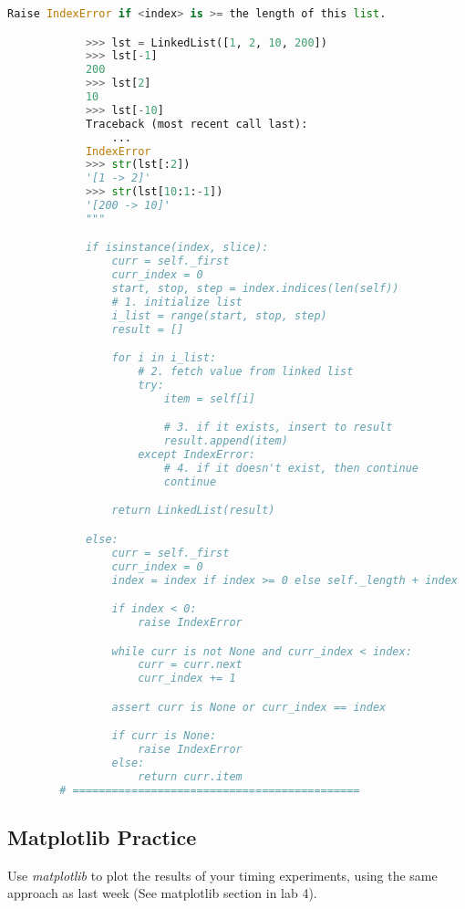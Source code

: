 \documentclass[12pt]{article}
\begin{document}
\begin{mdframed}
\begin{lstlisting}[language=python]
            Raise IndexError if <index> is >= the length of this list.

            >>> lst = LinkedList([1, 2, 10, 200])
            >>> lst[-1]
            200
            >>> lst[2]
            10
            >>> lst[-10]
            Traceback (most recent call last):
                ...
            IndexError
            >>> str(lst[:2])
            '[1 -> 2]'
            >>> str(lst[10:1:-1])
            '[200 -> 10]'
            """

            if isinstance(index, slice):
                curr = self._first
                curr_index = 0
                start, stop, step = index.indices(len(self))
                # 1. initialize list
                i_list = range(start, stop, step)
                result = []

                for i in i_list:
                    # 2. fetch value from linked list
                    try:
                        item = self[i]

                        # 3. if it exists, insert to result
                        result.append(item)
                    except IndexError:
                        # 4. if it doesn't exist, then continue
                        continue

                return LinkedList(result)

            else:
                curr = self._first
                curr_index = 0
                index = index if index >= 0 else self._length + index

                if index < 0:
                    raise IndexError

                while curr is not None and curr_index < index:
                    curr = curr.next
                    curr_index += 1

                assert curr is None or curr_index == index

                if curr is None:
                    raise IndexError
                else:
                    return curr.item
        # ============================================
\end{lstlisting}
\end{mdframed}


\subsection*{Matplotlib Practice}
Use \textit{matplotlib} to plot the results of your timing experiments, using the same
approach as last week (See matplotlib section in lab 4).
\end{document}
